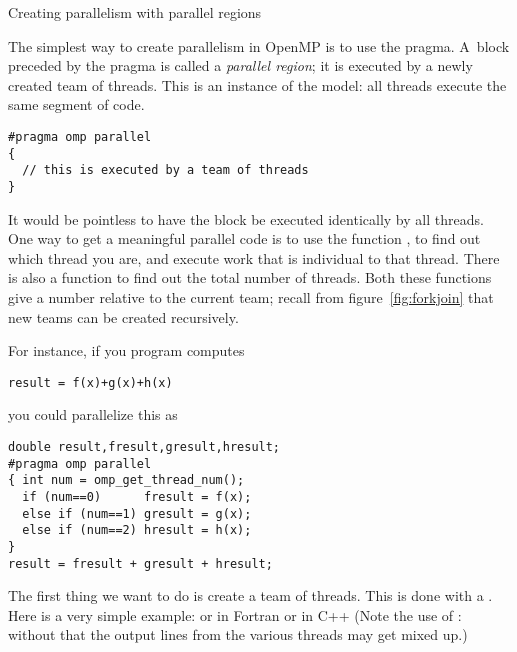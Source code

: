 
\label{sec:parallelregion}

 {Creating parallelism with parallel regions}

The simplest way to create parallelism in OpenMP is to use
the  pragma. A~block preceded by the  pragma
is called a \emph{parallel region}; it
is executed by a newly created team of threads. 
This is an instance of the  model: all threads execute the same
segment of code.
\begin{lstlisting}
#pragma omp parallel
{
  // this is executed by a team of threads
}
\end{lstlisting}
It would be pointless to have the block be executed identically by
all threads. One way to get a meaningful parallel code is to use the function
, to find out which thread you are,
and execute work that is individual to that thread.
There is also a function
 to find out the total number of threads.
Both these functions give a number relative to the current team;
recall from figure~\ref{fig:forkjoin} that new teams can be created recursively.

For instance, if you program computes
\begin{lstlisting}
result = f(x)+g(x)+h(x)
\end{lstlisting}
you could parallelize this as
\begin{lstlisting}
double result,fresult,gresult,hresult;
#pragma omp parallel
{ int num = omp_get_thread_num();
  if (num==0)      fresult = f(x);
  else if (num==1) gresult = g(x);
  else if (num==2) hresult = h(x);
}
result = fresult + gresult + hresult;
\end{lstlisting}


The first thing we want to do is create a team of threads. This
is done with a .
Here is a very simple example:
or in Fortran
or in C++
(Note the use of : without that
the output lines from the various threads may get mixed up.)

